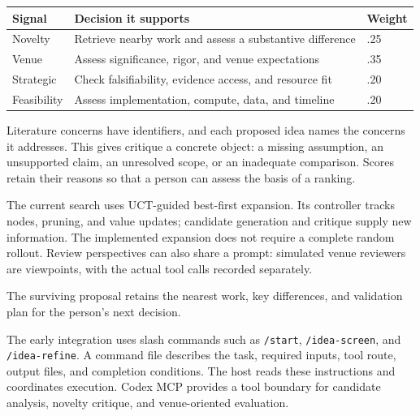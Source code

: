 \begin{center}\small
\begin{tabularx}{\textwidth}{P{25mm}Y P{17mm}}
\toprule
\textbf{Signal} & \textbf{Decision it supports} & \textbf{Weight}\\
\midrule
Novelty & Retrieve nearby work and assess a substantive difference & .25\\
Venue & Assess significance, rigor, and venue expectations & .35\\
Strategic & Check falsifiability, evidence access, and resource fit & .20\\
Feasibility & Assess implementation, compute, data, and timeline & .20\\
\bottomrule
\end{tabularx}
\end{center}
Literature concerns have identifiers, and each proposed idea names the concerns it addresses. This gives critique a concrete object: a missing assumption, an unsupported claim, an unresolved scope, or an inadequate comparison. Scores retain their reasons so that a person can assess the basis of a ranking.

The current search uses UCT-guided best-first expansion. Its controller tracks nodes, pruning, and value updates; candidate generation and critique supply new information. The implemented expansion does not require a complete random rollout. Review perspectives can also share a prompt: simulated venue reviewers are viewpoints, with the actual tool calls recorded separately.

\noindent\small The surviving proposal retains the nearest work, key differences, and validation plan for the person's next decision.

The early integration uses slash commands such as \texttt{/start}, \texttt{/idea-screen}, and \texttt{/idea-refine}. A command file describes the task, required inputs, tool route, output files, and completion conditions. The host reads these instructions and coordinates execution. Codex MCP provides a tool boundary for candidate analysis, novelty critique, and venue-oriented evaluation.

